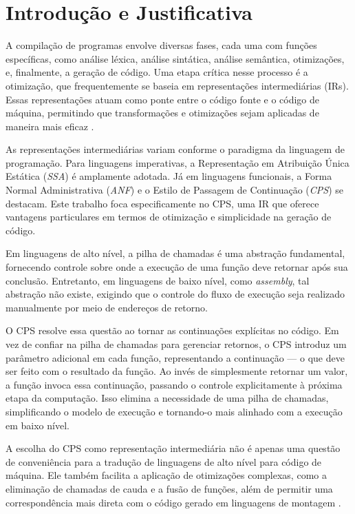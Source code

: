 \documentclass[12pt]{article}
\begin{document}
\section{Introdução e Justificativa} \label{sec:IntroducaoJustificativa}

A compilação de programas envolve diversas fases, cada uma com funções específicas, como análise léxica, análise sintática, análise semântica, otimizações, e, finalmente, a geração de código.
Uma etapa crítica nesse processo é a otimização, que frequentemente se baseia em representações intermediárias (IRs).
Essas representações atuam como ponte entre o código fonte e o código de máquina, permitindo que transformações e otimizações sejam aplicadas de maneira mais eficaz \cite{PLOTKIN1975125}.

As representações intermediárias variam conforme o paradigma da linguagem de programação.
Para linguagens imperativas, a Representação em Atribuição Única Estática (\textit{SSA}) é amplamente adotada.
Já em linguagens funcionais, a Forma Normal Administrativa (\textit{ANF}) e o Estilo de Passagem de Continuação (\textit{CPS}) se destacam.
Este trabalho foca especificamente no CPS, uma IR que oferece vantagens particulares em termos de otimização e simplicidade na geração de código.

Em linguagens de alto nível, a pilha de chamadas é uma abstração fundamental, fornecendo controle sobre onde a execução de uma função deve retornar após sua conclusão.
Entretanto, em linguagens de baixo nível, como \textit{assembly}, tal abstração não existe, exigindo que o controle do fluxo de execução seja realizado manualmente por meio de endereços de retorno.

O CPS resolve essa questão ao tornar as continuações explícitas no código.
Em vez de confiar na pilha de chamadas para gerenciar retornos, o CPS introduz um parâmetro adicional \cite{KENNEDY2007} em cada função, representando a continuação — o que deve ser feito com o resultado da função.
Ao invés de simplesmente retornar um valor, a função invoca essa continuação, passando o controle explicitamente à próxima etapa da computação.
Isso elimina a necessidade de uma pilha de chamadas, simplificando o modelo de execução e tornando-o mais alinhado com a execução em baixo nível.

A escolha do CPS como representação intermediária não é apenas uma questão de conveniência para a tradução de linguagens de alto nível para código de máquina.
Ele também facilita a aplicação de otimizações complexas, como a eliminação de chamadas de cauda e a fusão de funções, além de permitir uma correspondência mais direta com o código gerado em linguagens de montagem \cite{FLANAGAN1993}.
\end{document}

